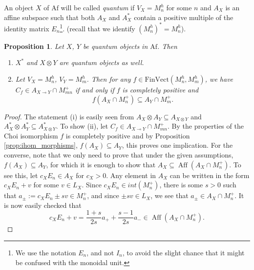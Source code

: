 \documentclass[12pt]{article}
\newtheorem{prop}{Proposition}
\theoremstyle{definition}
\theoremstyle{remark}
\def\aff{\operatorname{Aff}}
\def \Af{\mathrm{Af}}
\def \FV{\mathrm{FinVect}}
\begin{document}
An object $X$ of $\Af$ will be called {\em quantum} if $V_X=M_n^h$ for some $n$ and $A_X$ is an
affine subspace such that both $A_X$ and $A^*_X$ contain a positive multiple of the identity matrix
$E_n$\footnote{We use the notation $E_n$, and not $I_n$, to avoid the slight chance that
it might be confused with the monoidal unit.}.
(recall that we identify $(M_n^h)^*=M_n^h$). 




\begin{prop}\label{prop:ihom_quantum} Let $X$, $Y$ be quantum objects in $\Af$. Then 
\begin{enumerate}
\item[(i)] $X^*$ and $X\otimes Y$ are quantum objects as well. 
\item[(ii)] Let $V_X=M_n^h$, $V_Y=M_m^h$. Then for any $f\in \FV(M_n^h,M_m^h)$, we have
$C_f\in A_{X\multimap Y}\cap M_{mn}^+$ if and only if $f$ is completely positive and
\[
f(A_X\cap M_n^+)\subseteq A_Y\cap M_m^+.
\]
\end{enumerate}


\end{prop}

\begin{proof} The statement (i) is easily seen from  $A_X\otimes A_Y
\subseteq  A_{X\otimes Y}$ and $A^*_X\otimes A^*_Y\subseteq A^*_{X\otimes
Y}$. %
To show (ii), let $C_f\in   A_{X\multimap Y}\cap M_{mn}^+$. By the properties of the Choi
isomorphism $f$ is completely positive and by Proposition \ref{prop:ihom_morphisms},
$f(A_X)\subseteq A_Y$, this proves one implication. For the converse, note that we only
need to prove that under the given assumptions, $f(A_X)\subseteq A_Y$, for which it is enough
to show that $A_X\subseteq \aff(A_X\cap M_n^+)$. To see this, let  $c_XE_n\in  A_X$ for
$c_X>0$.  Any element in $A_X$ can be written in the form $c_XE_n+v$ for some $v\in L_X$.
Since $c_XE_n\in int(M_n^+)$, there is some $s>0$ such that $a_\pm:=c_XE_n\pm sv\in M_n^+$, and
since $\pm sv\in L_X$, we see that $a_\pm \in A_X\cap M_n^+$. It is now easily checked
that
\[
c_XE_n+v=\frac{1+s}{2s}a_++\frac{s-1}{2s}a_-\in \aff(A_X\cap M_n^+). 
\]


\end{proof}
\end{document}
